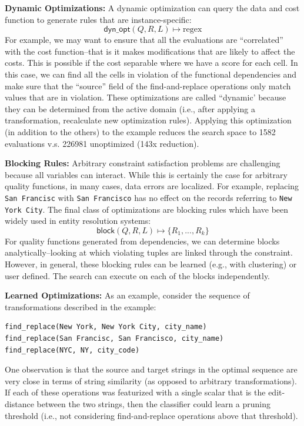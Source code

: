 \vspace{0.5em}\noindent\textbf{Dynamic Optimizations: } A dynamic optimization can query the data and cost function to generate rules that are instance-specific:
\[\textsf{dyn\_opt}(Q, R, L) \mapsto \text{regex}\]
For example, we may want to ensure that all the evaluations are ``correlated'' with the cost function--that is it makes modifications that are likely to affect the costs.
This is possible if the cost separable where we have a score for each cell. In this case, we can find all the cells in violation of the functional dependencies and make sure that the ``source'' field of the find-and-replace operations only match values that are in violation.
These optimizations are called ``dynamic' because they can be determined from the active domain (i.e., after applying a transformation, recalculate new optimization rules).
Applying this optimization (in addition to the others) to the example reduces the search space to 1582 evaluations v.s. 226981 unoptimized (143x reduction).

\vspace{0.5em}\noindent\textbf{Blocking Rules: }  Arbitrary constraint satisfaction problems are challenging because all variables can interact. While this is certainly the case for arbitrary quality functions, in many cases, data errors are localized. For example, replacing \texttt{San Francisc} with \texttt{San Francisco} has no effect on the records referring to \texttt{New York City}. The final class of optimizations are blocking rules which have been widely used in entity resolution systems:
\[\textsf{block}(Q, R, L) \mapsto \{R_1,...,R_k\} \]
For quality functions generated from dependencies, we can determine blocks analytically--looking at which violating tuples are linked through the constraint.
However, in general, these blocking rules can be learned (e.g., with clustering) or user defined.
The search can execute on each of the blocks independently.


\vspace{0.5em}\noindent\textbf{Learned Optimizations: } 
As an example, consider the sequence of transformations described in the example:
\begin{lstlisting}
find_replace(New York, New York City, city_name)
find_replace(San Francisc, San Francisco, city_name)
find_replace(NYC, NY, city_code)
\end{lstlisting}
One observation is that the source and target strings in the optimal sequence are very close in terms of string similarity (as opposed to arbitrary transformations).
If each of these operations was featurized with a single scalar that is the edit-distance between the two strings, then the classifier could learn a pruning threshold (i.e., not considering find-and-replace operations above that threshold).

